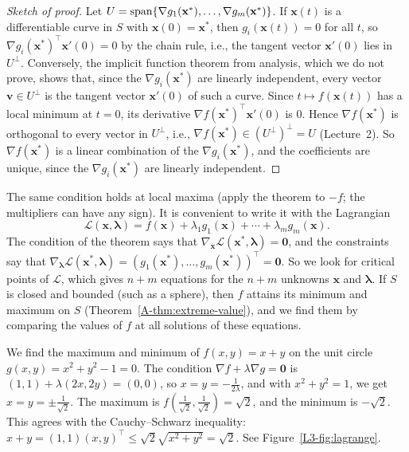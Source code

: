 \begin{proof}[Sketch of proof]
    Let $U = \operatorname{span}\{\nabla g_1(\mathbf{x}^*), \ldots, \nabla g_m(\mathbf{x}^*)\}$. If $\mathbf{x}(t)$ is a differentiable curve in $S$ with $\mathbf{x}(0) = \mathbf{x}^*$, then $g_i(\mathbf{x}(t)) = 0$ for all $t$, so $\nabla g_i(\mathbf{x}^*)^\top\mathbf{x}'(0) = 0$ by the chain rule, i.e., the tangent vector $\mathbf{x}'(0)$ lies in $U^\perp$. Conversely, the implicit function theorem from analysis, which we do not prove, shows that, since the $\nabla g_i(\mathbf{x}^*)$ are linearly independent, every vector $\mathbf{v} \in U^\perp$ is the tangent vector $\mathbf{x}'(0)$ of such a curve. Since $t \mapsto f(\mathbf{x}(t))$ has a local minimum at $t = 0$, its derivative $\nabla f(\mathbf{x}^*)^\top\mathbf{x}'(0)$ is $0$. Hence $\nabla f(\mathbf{x}^*)$ is orthogonal to every vector in $U^\perp$, i.e., $\nabla f(\mathbf{x}^*) \in (U^\perp)^\perp = U$ (Lecture~2). So $\nabla f(\mathbf{x}^*)$ is a linear combination of the $\nabla g_i(\mathbf{x}^*)$, and the coefficients are unique, since the $\nabla g_i(\mathbf{x}^*)$ are linearly independent.
\end{proof}

The same condition holds at local maxima (apply the theorem to $-f$; the multipliers can have any sign). It is convenient to write it with the Lagrangian
\[\mathcal{L}(\mathbf{x}, \boldsymbol{\lambda}) = f(\mathbf{x}) + \lambda_1 g_1(\mathbf{x}) + \cdots + \lambda_m g_m(\mathbf{x}).\]
The condition of the theorem says that $\nabla_{\mathbf{x}}\mathcal{L}(\mathbf{x}^*, \boldsymbol{\lambda}) = \mathbf{0}$, and the constraints say that $\nabla_{\boldsymbol{\lambda}}\mathcal{L}(\mathbf{x}^*, \boldsymbol{\lambda}) = (g_1(\mathbf{x}^*), \ldots, g_m(\mathbf{x}^*))^\top = \mathbf{0}$. So we look for critical points of $\mathcal{L}$, which gives $n + m$ equations for the $n + m$ unknowns $\mathbf{x}$ and $\boldsymbol{\lambda}$. If $S$ is closed and bounded (such as a sphere), then $f$ attains its minimum and maximum on $S$ (Theorem~\ref{A-thm:extreme-value}), and we find them by comparing the values of $f$ at all solutions of these equations.

\begin{example}\label{L3-ex:lagrange-circle}
    We find the maximum and minimum of $f(x, y) = x + y$ on the unit circle $g(x, y) = x^2 + y^2 - 1 = 0$. The condition $\nabla f + \lambda\nabla g = \mathbf{0}$ is $(1, 1) + \lambda(2x, 2y) = (0, 0)$, so $x = y = -\frac{1}{2\lambda}$, and with $x^2 + y^2 = 1$, we get $x = y = \pm\frac{1}{\sqrt{2}}$. The maximum is $f(\frac{1}{\sqrt{2}}, \frac{1}{\sqrt{2}}) = \sqrt{2}$, and the minimum is $-\sqrt{2}$. This agrees with the Cauchy--Schwarz inequality: $x + y = (1, 1)(x, y)^\top \leq \sqrt{2}\sqrt{x^2 + y^2} = \sqrt{2}$. See Figure~\ref{L3-fig:lagrange}.
\end{example}

